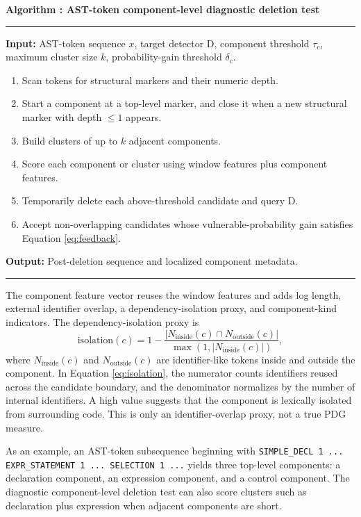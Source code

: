 \documentclass[letterpaper,twocolumn,10pt,twoside]{article}
\newcounter{algorithm}
\newenvironment{algorithmblock}[1]{%
  \refstepcounter{algorithm}%
  \par\medskip\noindent\begin{lrbox}{\algbox}\begin{minipage}{0.94\columnwidth}
  \small
  \textbf{Algorithm \thealgorithm: #1}\par
  \vspace{2pt}\hrule\vspace{3pt}
}{%
  \vspace{2pt}\hrule
  \end{minipage}\end{lrbox}\fbox{\usebox{\algbox}}\par\medskip
}
\newcommand{\alginput}[1]{\noindent\textbf{Input:} #1\par}
\newcommand{\algoutput}[1]{\noindent\textbf{Output:} #1\par}
\newenvironment{algsteps}{\begin{enumerate}[label=\arabic*:,leftmargin=1.8em,itemsep=1pt,topsep=2pt]}{\end{enumerate}}
\begin{document}
\begin{algorithmblock}{AST-token component-level diagnostic deletion test}
\label{alg:component}
\alginput{AST-token sequence $x$, target detector $\mathrm{D}$, component threshold $\tau_c$, maximum cluster size $k$, probability-gain threshold $\delta_c$.}
\begin{algsteps}
  \item Scan tokens for structural markers and their numeric depth.
  \item Start a component at a top-level marker, and close it when a new structural marker with depth $\leq 1$ appears.
  \item Build clusters of up to $k$ adjacent components.
  \item Score each component or cluster using window features plus component features.
  \item Temporarily delete each above-threshold candidate and query $\mathrm{D}$.
  \item Accept non-overlapping candidates whose vulnerable-probability gain satisfies Equation \eqref{eq:feedback}.
\end{algsteps}
\algoutput{Post-deletion sequence and localized component metadata.}
\end{algorithmblock}

The component feature vector reuses the window features and adds log length, external identifier overlap, a dependency-isolation proxy, and component-kind indicators. The dependency-isolation proxy is
\begin{equation}
  \text{isolation}(c) = 1 - \frac{|N_{\text{inside}}(c) \cap N_{\text{outside}}(c)|}{\max(1, |N_{\text{inside}}(c)|)},
  \label{eq:isolation}
\end{equation}
where $N_{\text{inside}}(c)$ and $N_{\text{outside}}(c)$ are identifier-like tokens inside and outside the component. In Equation \eqref{eq:isolation}, the numerator counts identifiers reused across the candidate boundary, and the denominator normalizes by the number of internal identifiers. A high value suggests that the component is lexically isolated from surrounding code. This is only an identifier-overlap proxy, not a true PDG measure.

As an example, an AST-token subsequence beginning with \texttt{SIMPLE\_DECL 1 ... EXPR\_STATEMENT 1 ... SELECTION 1 ...} yields three top-level components: a declaration component, an expression component, and a control component. The diagnostic component-level deletion test can also score clusters such as declaration plus expression when adjacent components are short.
\end{document}
